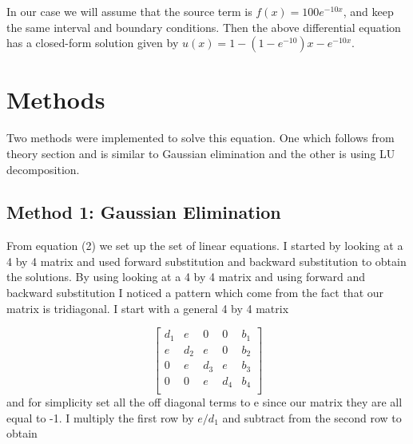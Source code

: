 \documentclass[11pt,a4wide]{article}
\begin{document}
In our case we will assume  that the source term is 
$f(x) = 100e^{-10x}$, and keep the same interval and boundary 
conditions. Then the above differential equation
has a closed-form  solution given by $u(x) = 1-(1-e^{-10})x-e^{-10x}$. 

\section{Methods}
Two methods were implemented to solve this equation. One which follows from theory 
section and is similar to Gaussian elimination and the other is using LU decomposition.

\subsection{Method 1: Gaussian Elimination}
From equation (2) we set up the set of linear equations. I started by looking at a 4 by 
4 matrix and used forward substitution and backward substitution to obtain the solutions. By 
using looking at a 4 by 4 matrix and using forward and backward substitution I noticed a pattern
which come from the fact that our matrix is tridiagonal. I start with a general 4 by 4 matrix 

\begin{equation}
\left[\begin{array}{cccc|c}
                           d_1& e& 0& 0& b_1\\ 
                           e& d_2& e& 0& b_2\\
                           0& e& d_3& e& b_3\\
                           0& 0& e& d_4& b_4\\
                      \end{array} \right]
\end{equation}
and for simplicity set all the off diagonal terms to e since our matrix they are all equal to -1. I 
multiply the first row by $e/d_1$ and subtract from the second row to obtain 
\end{document}
